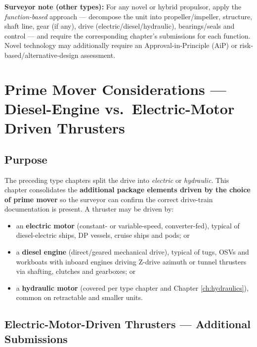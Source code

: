 \documentclass[11pt,a4paper]{report}
\begin{document}
\noindent\textbf{Surveyor note (other types):} For any novel or hybrid
propulsor, apply the \emph{function-based} approach --- decompose the unit into
propeller/impeller, structure, shaft line, gear (if any), drive
(electric/diesel/hydraulic), bearings/seals and control --- and require the
corresponding chapter's submissions for each function. Novel technology may
additionally require an Approval-in-Principle (AiP) or risk-based/alternative-design
assessment.

\newpage

\chapter{Prime Mover Considerations --- Diesel-Engine vs.\ Electric-Motor Driven Thrusters}
\label{ch:primemover}

\section{Purpose}

The preceding type chapters split the drive into \emph{electric} or
\emph{hydraulic}. This chapter consolidates the \textbf{additional package
elements driven by the choice of prime mover} so the surveyor can confirm the
correct drive-train documentation is present. A thruster may be driven by:
\begin{itemize}[leftmargin=*]
\item an \textbf{electric motor} (constant- or variable-speed, converter-fed), typical of diesel-electric ships, DP vessels, cruise ships and pods; or
\item a \textbf{diesel engine} (direct/geared mechanical drive), typical of tugs, OSVs and workboats with inboard engines driving Z-drive azimuth or tunnel thrusters via shafting, clutches and gearboxes; or
\item a \textbf{hydraulic motor} (covered per type chapter and Chapter \ref{ch:hydraulics}), common on retractable and smaller units.
\end{itemize}

\section{Electric-Motor-Driven Thrusters --- Additional Submissions}
\end{document}
